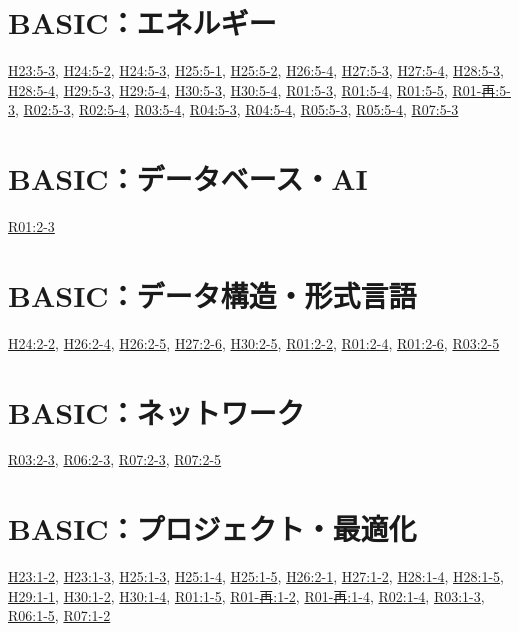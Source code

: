 \section{BASIC：エネルギー}
\hyperref[q:h23-reg-basic-5-3]{H23:5-3}, \hyperref[q:h24-reg-basic-5-2]{H24:5-2}, \hyperref[q:h24-reg-basic-5-3]{H24:5-3}, \hyperref[q:h25-reg-basic-5-1]{H25:5-1}, \hyperref[q:h25-reg-basic-5-2]{H25:5-2}, \hyperref[q:h26-reg-basic-5-4]{H26:5-4}, \hyperref[q:h27-reg-basic-5-3]{H27:5-3}, \hyperref[q:h27-reg-basic-5-4]{H27:5-4}, \hyperref[q:h28-reg-basic-5-3]{H28:5-3}, \hyperref[q:h28-reg-basic-5-4]{H28:5-4}, \hyperref[q:h29-reg-basic-5-3]{H29:5-3}, \hyperref[q:h29-reg-basic-5-4]{H29:5-4}, \hyperref[q:h30-reg-basic-5-3]{H30:5-3}, \hyperref[q:h30-reg-basic-5-4]{H30:5-4}, \hyperref[q:r01-reg-basic-5-3]{R01:5-3}, \hyperref[q:r01-reg-basic-5-4]{R01:5-4}, \hyperref[q:r01-reg-basic-5-5]{R01:5-5}, \hyperref[q:r01-ret-basic-5-3]{R01-再:5-3}, \hyperref[q:r02-reg-basic-5-3]{R02:5-3}, \hyperref[q:r02-reg-basic-5-4]{R02:5-4}, \hyperref[q:r03-reg-basic-5-4]{R03:5-4}, \hyperref[q:r04-reg-basic-5-3]{R04:5-3}, \hyperref[q:r04-reg-basic-5-4]{R04:5-4}, \hyperref[q:r05-reg-basic-5-3]{R05:5-3}, \hyperref[q:r05-reg-basic-5-4]{R05:5-4}, \hyperref[q:r07-reg-basic-5-3]{R07:5-3}
\section{BASIC：データベース・AI}
\hyperref[q:r01-reg-basic-2-3]{R01:2-3}
\section{BASIC：データ構造・形式言語}
\hyperref[q:h24-reg-basic-2-2]{H24:2-2}, \hyperref[q:h26-reg-basic-2-4]{H26:2-4}, \hyperref[q:h26-reg-basic-2-5]{H26:2-5}, \hyperref[q:h27-reg-basic-2-6]{H27:2-6}, \hyperref[q:h30-reg-basic-2-5]{H30:2-5}, \hyperref[q:r01-reg-basic-2-2]{R01:2-2}, \hyperref[q:r01-reg-basic-2-4]{R01:2-4}, \hyperref[q:r01-reg-basic-2-6]{R01:2-6}, \hyperref[q:r03-reg-basic-2-5]{R03:2-5}
\section{BASIC：ネットワーク}
\hyperref[q:r03-reg-basic-2-3]{R03:2-3}, \hyperref[q:r06-reg-basic-2-3]{R06:2-3}, \hyperref[q:r07-reg-basic-2-3]{R07:2-3}, \hyperref[q:r07-reg-basic-2-5]{R07:2-5}
\section{BASIC：プロジェクト・最適化}
\hyperref[q:h23-reg-basic-1-2]{H23:1-2}, \hyperref[q:h23-reg-basic-1-3]{H23:1-3}, \hyperref[q:h25-reg-basic-1-3]{H25:1-3}, \hyperref[q:h25-reg-basic-1-4]{H25:1-4}, \hyperref[q:h25-reg-basic-1-5]{H25:1-5}, \hyperref[q:h26-reg-basic-2-1]{H26:2-1}, \hyperref[q:h27-reg-basic-1-2]{H27:1-2}, \hyperref[q:h28-reg-basic-1-4]{H28:1-4}, \hyperref[q:h28-reg-basic-1-5]{H28:1-5}, \hyperref[q:h29-reg-basic-1-1]{H29:1-1}, \hyperref[q:h30-reg-basic-1-2]{H30:1-2}, \hyperref[q:h30-reg-basic-1-4]{H30:1-4}, \hyperref[q:r01-reg-basic-1-5]{R01:1-5}, \hyperref[q:r01-ret-basic-1-2]{R01-再:1-2}, \hyperref[q:r01-ret-basic-1-4]{R01-再:1-4}, \hyperref[q:r02-reg-basic-1-4]{R02:1-4}, \hyperref[q:r03-reg-basic-1-3]{R03:1-3}, \hyperref[q:r06-reg-basic-1-5]{R06:1-5}, \hyperref[q:r07-reg-basic-1-2]{R07:1-2}
